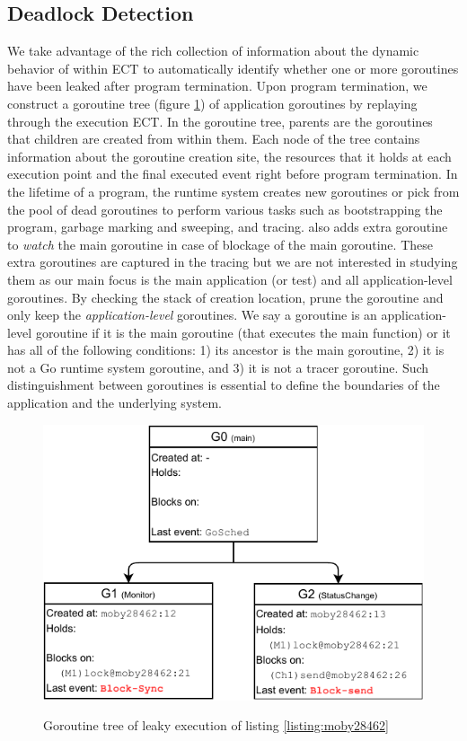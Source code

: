 \subsection{Deadlock Detection}
\label{sec:dld}
We take advantage of the rich collection of information about the dynamic behavior of within ECT to automatically identify whether one or more goroutines have been leaked after program termination.
%
Upon program termination, we construct a goroutine tree (figure \ref{fig:gtree}) of application goroutines by replaying through the execution ECT.
%
In the goroutine tree, parents are the goroutines that children are created from within them. Each node of the tree contains information about the goroutine creation site, the resources that it holds at each execution point and the final executed event right before program termination.
%
In the lifetime of a program, the runtime system creates new goroutines or pick from the pool of dead goroutines to perform various tasks such as bootstrapping the program, garbage marking and sweeping, and tracing.
%
\goat also adds extra goroutine to \textit{watch} the main goroutine in case of blockage of the main goroutine.
%
These extra goroutines are captured in the tracing but we are not interested in studying them as our main focus is the main application (or test) and all application-level goroutines.
%
By checking the stack of creation location, \goat prune the goroutine and only keep the \textit{application-level} goroutines.
%
We say a goroutine is an application-level goroutine if it is the main goroutine (that executes the main function) or it has all of the following conditions:
1) its ancestor is the main goroutine,
2) it is not a Go runtime system goroutine, and
3) it is not a tracer goroutine.
Such distinguishment between goroutines is essential to define the boundaries of the application and the underlying system.



\begin{figure}[]

\includegraphics[width=0.9\linewidth]{figs/gtree.pdf}
\label{fig:gtree}
\caption{Goroutine tree of leaky execution of listing \ref{listing:moby28462}}
\end{figure}

